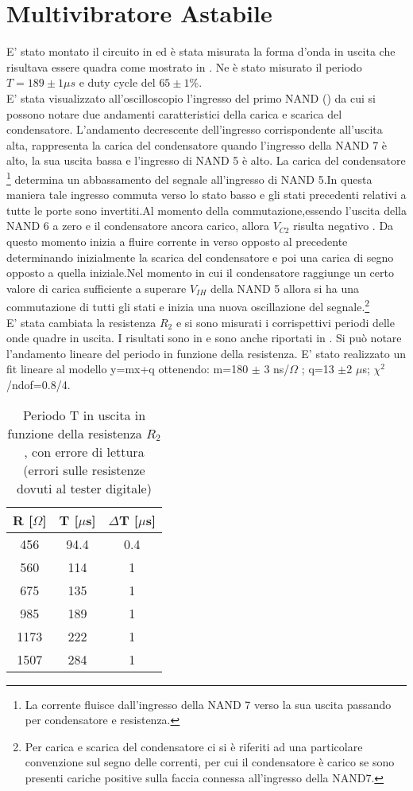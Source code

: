 \section{Multivibratore Astabile}
E' stato montato il circuito in  ed è stata misurata la forma d'onda in uscita che risultava essere quadra come mostrato in . Ne è stato misurato il periodo $T= 189 \pm 1 \mu s$ e duty cycle del  $65 \pm 1$\%. \\
E' stata visualizzato all'oscilloscopio l'ingresso del primo NAND () da cui si possono notare due andamenti caratteristici della carica e scarica del condensatore. L'andamento decrescente dell'ingresso corrispondente all'uscita alta, rappresenta la carica del condensatore quando l'ingresso della NAND 7 è alto, la sua uscita bassa e l'ingresso di NAND 5 è alto. La carica del condensatore \footnote{La corrente fluisce dall'ingresso della NAND 7 verso la sua uscita passando per condensatore e resistenza. } determina un abbassamento del segnale all'ingresso di NAND 5.In questa maniera tale ingresso commuta verso lo stato basso e gli stati precedenti relativi a tutte le porte sono invertiti.Al momento della commutazione,essendo l'uscita della NAND 6 a zero e il condensatore ancora carico, allora $V_{C2}$ risulta negativo . Da questo momento inizia a fluire corrente in verso opposto al precedente determinando inizialmente la scarica del condensatore e poi una carica di segno opposto a quella iniziale.Nel momento in cui il condensatore raggiunge un certo valore di carica sufficiente a superare $V_{IH}$ della NAND 5 allora si ha una commutazione di tutti gli stati e inizia una nuova oscillazione del segnale.\footnote{Per carica e scarica del condensatore ci si è riferiti ad una particolare convenzione sul segno delle correnti, per cui il condensatore è carico se sono presenti cariche positive sulla faccia connessa all'ingresso della NAND7.}\\
E' stata cambiata la resistenza $R_2$ e si sono misurati i corrispettivi periodi delle onde quadre in uscita. I risultati sono in  e sono anche riportati in . Si può notare l'andamento lineare del periodo in funzione della resistenza. E' stato realizzato un fit lineare al modello y=mx+q ottenendo: m=180 $\pm$ 3 ns/$\Omega$ ; q=13 $\pm$2 $\mu$s; $\chi^{2}$/ndof=0.8/4.\\
\begin{table}[h]
	\centering
	\begin{tabular}{ccc}
		{R [$\Omega$]} & {T [$\mu $s]} & {$\Delta$T [$\mu $s]} \\
		\midrule
           456 & 94.4 & 0.4\\
           560 & 114 & 1\\
           675 & 135 & 1\\
           985 & 189 & 1\\
           1173 & 222 & 1\\
           1507 & 284 & 1\\
 	\end{tabular}
	\caption{ Periodo T in uscita in funzione della resistenza $R_2$, con errore di lettura (errori sulle resistenze dovuti al tester digitale)}
	\label{t:periodo}
\end{table}

